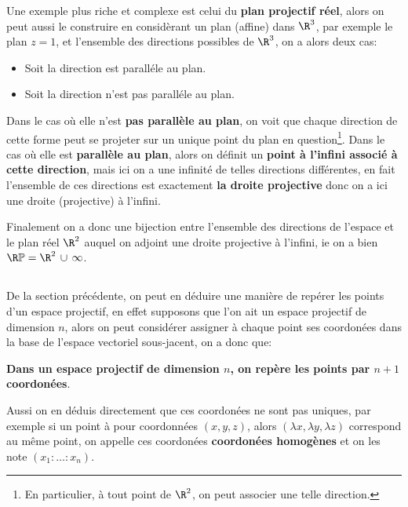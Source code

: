 \documentclass{report}
\begin{document}
   
   Une exemple plus riche et complexe est celui du \textbf{plan projectif réel}, alors on peut aussi le construire en considèrant un plan (affine) dans \(\R^3\), par exemple le plan \(z = 1\), et l'ensemble des directions possibles de \(\R^3\), on a alors deux cas:
   \begin{itemize}
      \item Soit la direction est paralléle au plan.
      \item Soit la direction n'est pas paralléle au plan.
   \end{itemize}
   Dans le cas où elle n'est \textbf{pas parallèle au plan}, on voit que chaque direction de cette forme peut se projeter sur un unique point du plan en question\footnote[1]{En particulier, à tout point de \(\R^2\), on peut associer une telle direction.}.\+
   Dans le cas où elle est \textbf{parallèle au plan}, alors on définit un \textbf{point à l'infini associé à cette direction}, mais ici on a une infinité de telles directions différentes, en fait l'ensemble de ces directions est exactement \textbf{la droite projective} donc on a ici une droite (projective) à l'infini.\<

   Finalement on a donc une bijection entre l'ensemble des directions de l'espace et le plan réel \(\R^2\) auquel on adjoint une droite projective à l'infini, ie on a bien \(\R\mathbb{P} = \R^2 \, \cup \, \infty\).

   \subsection*{}
   De la section précédente, on peut en déduire une manière de repérer les points d'un espace projectif, en effet supposons que l'on ait un espace projectif de dimension \(n\), alors on peut considérer assigner à chaque point ses coordonées dans la base de l'espace vectoriel sous-jacent, on a donc que:
   \begin{center}
      \textbf{Dans un espace projectif de dimension \(n\), on repère les points par \(n+1\) coordonées}.
   \end{center}
   Aussi on en déduis directement que ces coordonées ne sont pas uniques, par exemple si un point à pour coordonnées \((x, y, z)\), alors \((\lambda x, \lambda y, \lambda z)\) correspond au même point, on appelle ces coordonées \textbf{coordonées homogènes} et on les note \((x_1 : \ldots : x_n)\).\<
\end{document}
